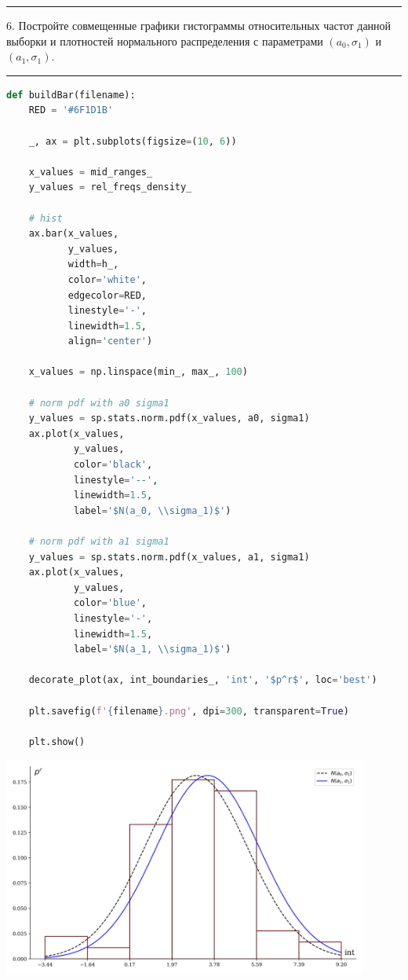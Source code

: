 \documentclass[a4paper, 14pt]{extarticle}
\begin{document}
\rule{\linewidth}{0.1mm}

6. Постройте совмещенные графики гистограммы относительных частот данной выборки и плотностей 
нормального распределения с параметрами $(a_0, \sigma_1)$ и $(a_1, \sigma_1)$.

\rule{\linewidth}{0.1mm}

\begin{center}
    \begin{lstlisting}[language=Python]
def buildBar(filename):
    RED = '#6F1D1B'

    _, ax = plt.subplots(figsize=(10, 6))

    x_values = mid_ranges_
    y_values = rel_freqs_density_

    # hist
    ax.bar(x_values, 
           y_values, 
           width=h_, 
           color='white', 
           edgecolor=RED, 
           linestyle='-', 
           linewidth=1.5, 
           align='center')
    
    x_values = np.linspace(min_, max_, 100)

    # norm pdf with a0 sigma1
    y_values = sp.stats.norm.pdf(x_values, a0, sigma1)
    ax.plot(x_values, 
            y_values, 
            color='black', 
            linestyle='--', 
            linewidth=1.5, 
            label='$N(a_0, \\sigma_1)$')

    # norm pdf with a1 sigma1
    y_values = sp.stats.norm.pdf(x_values, a1, sigma1)
    ax.plot(x_values, 
            y_values, 
            color='blue', 
            linestyle='-', 
            linewidth=1.5, 
            label='$N(a_1, \\sigma_1)$')

    decorate_plot(ax, int_boundaries_, 'int', '$p^r$', loc='best')

    plt.savefig(f'{filename}.png', dpi=300, transparent=True)

    plt.show()
    \end{lstlisting}
\end{center}

\begin{center}
    \includegraphics[width=0.9\textwidth]{hist_pdf1_pdf2}
\end{center}
\end{document}
